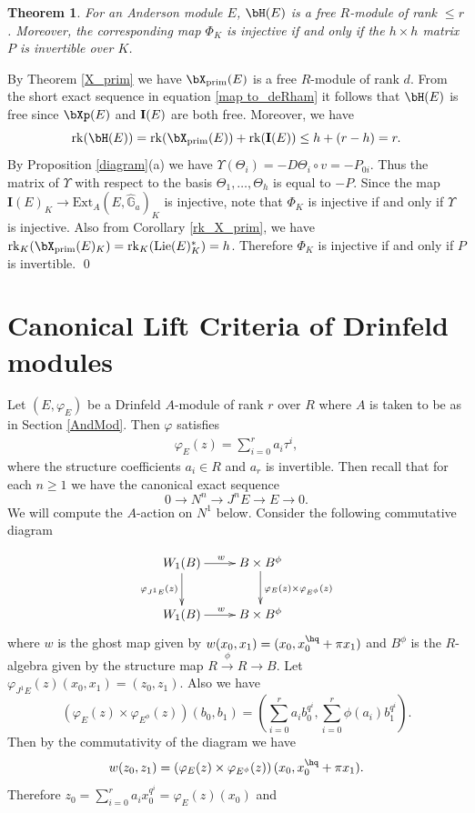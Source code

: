 \documentclass{amsart}
\newtheorem {theorem} {\bf{Theorem}}[section]
\numberwithin {equation}{section}
\def \vp{\varphi}
\newcommand{\bI}{{\bf I}}
\begin{document}
\begin{theorem}\label{finite_dim_thm} 
For an Anderson module $E$, ${\bH}(E)$ is a free $R$-module of rank 
$\leq r$. Moreover, the corresponding map $\Phi_{K}$ is injective if and only if 
the $h\times h$ matrix $P$ is invertible over $K$.
\end{theorem}
\proof By Theorem \ref{X_prim} we have $\bX_{\mathrm{prim}}(E)$ is a free 
$R$-module of rank $d$.
From the short exact sequence in equation \eqref{map to_deRham} it follows that ${\bH}(E)$ is free since $\bXp(E)$ and $\bI(E)$ are both free. 
Moreover, we have 
$$\mathrm{rk}({\bH}(E))= \mathrm{rk}({\bX}_{\mathrm{prim}}(E)) + \mathrm{rk}(\mathbf{I}(E))\leq h+(r-h)=r.$$ 
By Proposition \ref{diagram}(a) we have $\Upsilon(\Theta_{i})=-D\Theta_{i}\circ v=-P_{0i}$. Thus the matrix of $\Upsilon$ with respect to the basis $\Theta_{1},\ldots,\Theta_{h}$ is equal to $-P$. Since the map $\mathbf{I}(E)_{K}\rightarrow \mathrm{Ext}_{A}(E,\hat{\mathbb{G}}_{a})_{K} $ is injective, note that $\Phi_{K}$ is injective if and only if $\Upsilon$ is injective. Also from Corollary \ref{rk_X_prim}, we have $\mathrm{rk}_{K}({\bX}_{\mathrm{prim}}(E)_{K})=\mathrm{rk}_{K}(\mathrm{Lie} (E)^{*}_{K})=h$. Therefore $\Phi_{K}$ is injective if and only if $P$ is invertible. \qed

\section{Canonical Lift Criteria of Drinfeld modules}\label{Drinfeld_module}


Let $(E,\varphi_{E})$ be a Drinfeld $A$-module of rank $r$ over $R$ where 
$A$ is taken to be as in Section \ref{AndMod}. Then $\vp$ satisfies
\begin{align}
\label{struct-coeff}
\varphi_{E}(z)=\displaystyle{\sum_{i=0}^{r}}a_{i}\tau^{i},
\end{align} 
where the structure coefficients $a_i \in R$ and $a_r$ is invertible.
Then recall that for each $n\geq 1$ we have the canonical exact sequence 
$$0\longrightarrow N^{n}\longrightarrow J^{n}E\longrightarrow E\longrightarrow 0.$$
We will compute the $A$-action on $N^{1}$ below. Consider the following commutative  diagram

$${
\xymatrix{
W_{1}(B)\ar[d]_{\varphi_{J^{1}E}(z)} \ar[r]^{w} &B\times B^{\phi}\ar[d]^{\varphi_{E}(z)\times \varphi_{E^{\phi}}(z)}  \\
W_{1}(B) \ar[r]^{w} &B\times B^{\phi} }}
$$
where $w$ is the ghost map given by $w(x_{0},x_{1})=(x_{0},x_{0}^{\hq}+\pi x_{1})$ and $B^{\phi}$ is the $R$-algebra given by the structure map $R\xrightarrow{\phi}R\rightarrow B$.
Let $\varphi_{J^{1}E}(z)(x_{0},x_{1})=(z_{0},z_{1})$. Also we have  $$\left(\varphi_{E}(z)\times \varphi_{E^{\phi}}(z)\right)(b_{0},b_{1})=(\displaystyle{\sum_{i=0}^{r}} a_{i}b_{0}^{q^{i}},\displaystyle{\sum_{i=0}^{r}} \phi(a_{i})b_{1}^{q^{i}}).$$
Then by the commutativity of the diagram we have  $$w(z_{0},z_{1})= \left(\varphi_{E}(z)\times \varphi_{E^{\phi}}(z)\right)(x_{0},x_{0}^{\hq}+\pi x_{1}).$$
Therefore $z_{0}=\displaystyle{\sum_{i=0}^{r}} a_{i}x_{0}^{q^{i}}=\varphi_{E}(z)(x_{0})$ and 
\end{document}
